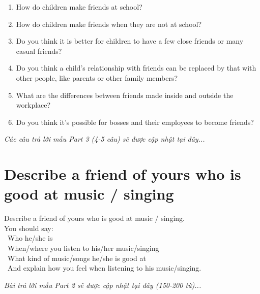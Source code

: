 \begin{ieltsprompt}
\begin{enumerate}[itemsep=4pt]
    \item How do children make friends at school?
    \item How do children make friends when they are not at school?
    \item Do you think it is better for children to have a few close friends or many casual friends?
    \item Do you think a child's relationship with friends can be replaced by that with other people, like parents or other family members?
    \item What are the differences between friends made inside and outside the workplace?
    \item Do you think it's possible for bosses and their employees to become friends?
\end{enumerate}
\end{ieltsprompt}

\vspace{1em}
\textit{Các câu trả lời mẫu Part 3 (4-5 câu) sẽ được cập nhật tại đây...}
\vspace{2em}

\section{Describe a friend of yours who is good at music / singing}
\begin{ieltsprompt}
Describe a friend of yours who is good at music / singing. \\
You should say: \\
\textbullet\ Who he/she is \\
\textbullet\ When/where you listen to his/her music/singing \\
\textbullet\ What kind of music/songs he/she is good at \\
\textbullet\ And explain how you feel when listening to his music/singing. \\
\end{ieltsprompt}

\vspace{1em}
\textit{Bài trả lời mẫu Part 2 sẽ được cập nhật tại đây (150-200 từ)...}
\vspace{2em}

